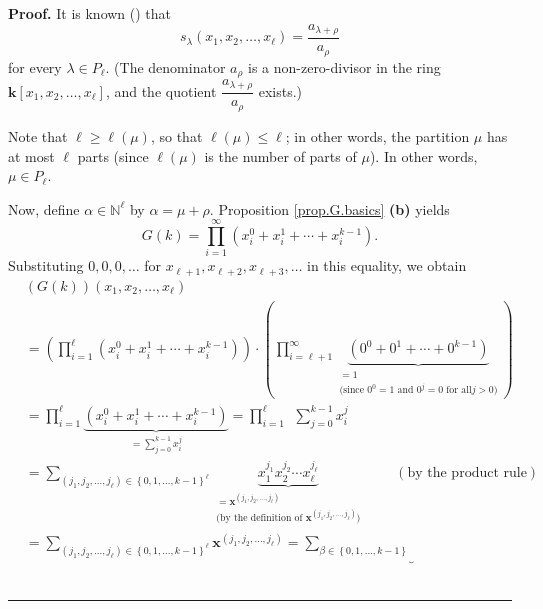 \documentclass[numbers=enddot,12pt,final,onecolumn,notitlepage]{scrartcl}%
\theoremstyle{definition}
\newenvironment{proof}[1][Proof]{\noindent\textbf{#1.} }{\ \rule{0.5em}{0.5em}}
\let\sumnonlimits\sum
\let\prodnonlimits\prod
\renewcommand{\sum}{\sumnonlimits\limits}
\renewcommand{\prod}{\prodnonlimits\limits}
\newenvironment{verlong}{}{}
\begin{document}
\begin{verlong}
\begin{proof}
It is known (\cite[Corollary 2.6.7]{GriRei}) that%
\begin{equation}
s_{\lambda}\left(  x_{1},x_{2},\ldots,x_{\ell}\right)  =\dfrac{a_{\lambda
+\rho}}{a_{\rho}} \label{pf.thm.G.pieri.slam}%
\end{equation}
for every $\lambda\in P_{\ell}$. (The denominator $a_{\rho}$ is a
non-zero-divisor in the ring $\mathbf{k}\left[  x_{1},x_{2},\ldots,x_{\ell
}\right]  $, and the quotient $\dfrac{a_{\lambda+\rho}}{a_{\rho}}$ exists.)

Note that $\ell\geq\ell\left(  \mu\right)  $, so that $\ell\left(  \mu\right)
\leq\ell$; in other words, the partition $\mu$ has at most $\ell$ parts (since
$\ell\left(  \mu\right)  $ is the number of parts of $\mu$). In other words,
$\mu\in P_{\ell}$.

Now, define $\alpha\in\mathbb{N}^{\ell}$ by $\alpha=\mu+\rho$. Proposition
\ref{prop.G.basics} \textbf{(b)} yields%
\[
G\left(  k\right)  =\prod_{i=1}^{\infty}\left(  x_{i}^{0}+x_{i}^{1}%
+\cdots+x_{i}^{k-1}\right)  .
\]
Substituting $0,0,0,\ldots$ for $x_{\ell+1},x_{\ell+2},x_{\ell+3},\ldots$ in
this equality, we obtain%
\begin{align}
&  \left(  G\left(  k\right)  \right)  \left(  x_{1},x_{2},\ldots,x_{\ell
}\right) \nonumber\\
&  =\left(  \prod_{i=1}^{\ell}\left(  x_{i}^{0}+x_{i}^{1}+\cdots+x_{i}%
^{k-1}\right)  \right)  \cdot\left(  \prod_{i=\ell+1}^{\infty}%
\underbrace{\left(  0^{0}+0^{1}+\cdots+0^{k-1}\right)  }%
_{\substack{=1\\\text{(since }0^{0}=1\text{ and }0^{j}=0\text{ for all
}j>0\text{)}}}\right) \nonumber\\
&  =\prod_{i=1}^{\ell}\underbrace{\left(  x_{i}^{0}+x_{i}^{1}+\cdots
+x_{i}^{k-1}\right)  }_{=\sum_{j=0}^{k-1}x_{i}^{j}}=\prod_{i=1}^{\ell}%
\ \ \sum_{j=0}^{k-1}x_{i}^{j}\label{pf.thm.G.pieri.Gkxl1}\\
&  =\sum_{\left(  j_{1},j_{2},\ldots,j_{\ell}\right)  \in\left\{
0,1,\ldots,k-1\right\}  ^{\ell}}\underbrace{x_{1}^{j_{1}}x_{2}^{j_{2}}\cdots
x_{\ell}^{j_{\ell}}}_{\substack{=\mathbf{x}^{\left(  j_{1},j_{2}%
,\ldots,j_{\ell}\right)  }\\\text{(by the definition of }\mathbf{x}^{\left(
j_{1},j_{2},\ldots,j_{\ell}\right)  }\text{)}}}\ \ \ \ \ \ \ \ \ \ \left(
\text{by the product rule}\right) \nonumber\\
&  =\sum_{\left(  j_{1},j_{2},\ldots,j_{\ell}\right)  \in\left\{
0,1,\ldots,k-1\right\}  ^{\ell}}\mathbf{x}^{\left(  j_{1},j_{2},\ldots
,j_{\ell}\right)  }=\underbrace{\sum_{\beta\in\left\{  0,1,\ldots,k-1\right\}
}}
\end{align}
\end{proof}
\end{verlong}
\end{document}
